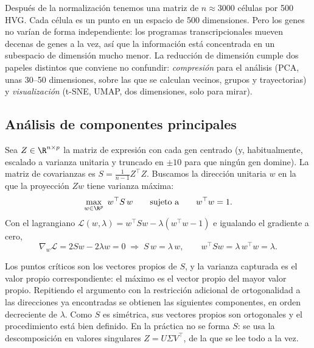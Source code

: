 Después de la normalización tenemos una matriz de $n\approx\num{3000}$ células por \num{500} HVG. Cada célula es un punto en un espacio de 500 dimensiones. Pero los genes no varían de forma independiente: los programas transcripcionales mueven decenas de genes a la vez, así que la información está concentrada en un subespacio de dimensión mucho menor. La reducción de dimensión cumple dos papeles distintos que conviene no confundir: \emph{compresión} para el análisis (PCA, unas 30--50 dimensiones, sobre las que se calculan vecinos, grupos y trayectorias) y \emph{visualización} (t-SNE, UMAP, dos dimensiones, solo para mirar).

\subsection{Análisis de componentes principales}

Sea $Z\in\R^{n\times p}$ la matriz de expresión con cada gen centrado (y, habitualmente, escalado a varianza unitaria y truncado en $\pm10$ para que ningún gen domine). La matriz de covarianzas es $S=\frac{1}{n-1}Z^{\top}Z$. Buscamos la dirección unitaria $w$ en la que la proyección $Zw$ tiene varianza máxima:
\begin{equation}\label{eq:12-pca-prob}
\max_{w\in\R^p}\; w^{\top} S\, w \qquad\text{sujeto a}\qquad w^{\top}w = 1.
\end{equation}
Con el lagrangiano $\mathcal{L}(w,\lambda)=w^\top S w-\lambda(w^\top w-1)$ e igualando el gradiente a cero,
\begin{equation}\label{eq:12-pca-eig}
\nabla_w\mathcal{L}=2Sw-2\lambda w=0\;\Longrightarrow\; S\,w=\lambda\,w,\qquad w^\top S w=\lambda\,w^\top w=\lambda.
\end{equation}
\begin{simbolos}
\end{simbolos}
Los puntos críticos son los vectores propios de $S$, y la varianza capturada es el valor propio correspondiente: el máximo es el vector propio del mayor valor propio. Repitiendo el argumento con la restricción adicional de ortogonalidad a las direcciones ya encontradas se obtienen las siguientes componentes, en orden decreciente de $\lambda$. Como $S$ es simétrica, sus vectores propios son ortogonales y el procedimiento está bien definido. En la práctica no se forma $S$: se usa la descomposición en valores singulares $Z=U\Sigma V^\top$, de la que se lee todo a la vez.

